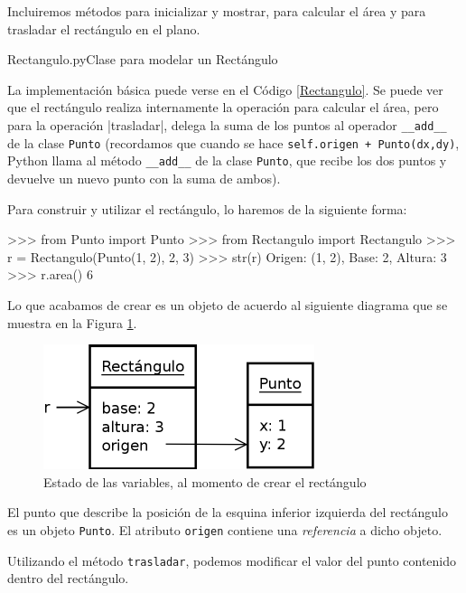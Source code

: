 Incluiremos métodos para inicializar y mostrar, para calcular el área y
para trasladar el rectángulo en el plano.

\begin{codigo}{Rectangulo.py}{Clase para modelar un Rectángulo}
\label{Rectangulo}

\end{codigo}

La implementación básica puede verse en el Código \ref{Rectangulo}.  Se
puede ver que el rectángulo realiza internamente la operación para calcular
el área, pero para la operación |trasladar|, delega la suma de los puntos
al operador \lstinline!__add__! de la clase \lstinline!Punto!
(recordamos que cuando se hace \lstinline!self.origen + Punto(dx,dy)!,
Python llama al método \lstinline!__add__! de la clase \lstinline!Punto!,
que recibe los dos puntos y devuelve un nuevo punto con la suma de ambos).

Para construir y utilizar el rectángulo, lo haremos de la siguiente forma:

\begin{codigo-python-sn}
>>> from Punto import Punto
>>> from Rectangulo import Rectangulo
>>> r = Rectangulo(Punto(1, 2), 2, 3)
>>> str(r)
Origen: (1, 2), Base: 2, Altura: 3
>>> r.area()
6
\end{codigo-python-sn}

Lo que acabamos de crear es un objeto de acuerdo al siguiente diagrama que
se muestra en la Figura \ref{rectangulo_punto}.

\begin{figure}[htb]
\includegraphics{graficos/15_Rectangulo_Punto}
\caption{Estado de las variables, al momento de crear el rectángulo}
\label{rectangulo_punto}
\end{figure}

El punto que describe la posición de la esquina inferior izquierda del
rectángulo es un objeto \lstinline!Punto!. El atributo \lstinline!origen!
contiene una {\it referencia} a dicho objeto.

Utilizando el método \lstinline!trasladar!, podemos modificar el valor del
punto contenido dentro del rectángulo.

